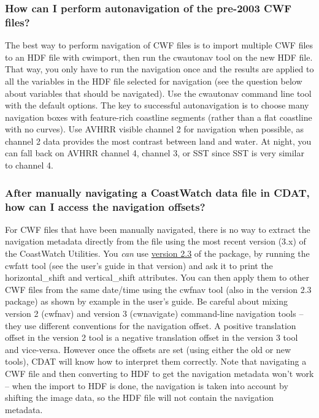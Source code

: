\subsubsection*{How can I perform autonavigation of the pre-2003 CWF files?}

The best way to perform navigation of CWF files is to import multiple
CWF files to an HDF file with cwimport, then run the cwautonav tool on
the new HDF file.  That way, you only have to run the navigation once
and the results are applied to all the variables in the HDF file
selected for navigation (see the question below about variables that
should be navigated).  Use the cwautonav command line tool with the
default options.  The key to successful autonavigation is to choose
many navigation boxes with feature-rich coastline segments (rather
than a flat coastline with no curves).  Use AVHRR visible channel 2
for navigation when possible, as channel 2 data provides the most
contrast between land and water.  At night, you can fall back on AVHRR
channel 4, channel 3, or SST since SST is very similar to channel 4.

\subsubsection*{After manually navigating a CoastWatch data file in CDAT, how can I access the navigation offsets?}

For CWF files that have been manually navigated, there is no way to
extract the navigation metadata directly from the file using the most
recent version (3.x) of the CoastWatch Utilities.  You {\em can} use
\href{http://coastwatch.noaa.gov/cw_cwfv2.html}{version 2.3} of the
package, by running the cwfatt tool (see the user's guide in that
version) and ask it to print the {\file horizontal\_shift} and {\file
vertical\_shift} attributes.  You can then apply them to other CWF
files from the same date/time using the cwfnav tool (also in the
version 2.3 package) as shown by example in the user's guide.  Be
careful about mixing version 2 (cwfnav) and version 3 (cwnavigate)
command-line navigation tools -- they use different conventions for
the navigation offset.  A positive translation offset in the version 2
tool is a negative translation offset in the version 3 tool and
vice-versa.  However once the offsets are set (using either the old or
new tools), CDAT will know how to interpret them correctly.  Note that
navigating a CWF file and then converting to HDF to get the navigation
metadata won't work -- when the import to HDF is done, the navigation
is taken into account by shifting the image data, so the HDF file will
not contain the navigation metadata.

